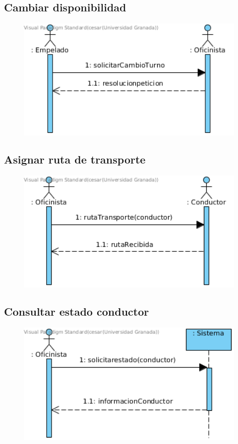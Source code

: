\subsection{Cambiar disponibilidad}
\begin{figure}[H]
	\centering
	\includegraphics[width=16cm]{4}
\end{figure}
\subsection{Asignar ruta de transporte}
\begin{figure}[H]
	\centering
	\includegraphics[width=16cm]{5}
\end{figure}
\subsection{Consultar estado conductor}
\begin{figure}[H]
	\centering
	\includegraphics[width=16cm]{6}
\end{figure}
